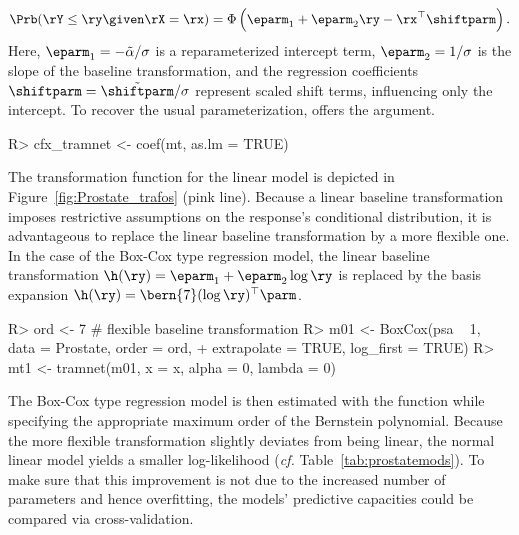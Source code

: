\begin{align*} \label{Lm}
  \Prb(\rY \le  \ry \given \rX = \rx) = \Phi\left(\eparm_1 + \eparm_2 \ry -
    \rx^\top \shiftparm\right).
\end{align*}
Here, $\eparm_1 = -\tilde{\alpha} / \sigma$ is a reparameterized intercept term,
$\eparm_2 = 1 / \sigma$ is the slope of the baseline transformation, and the
regression coefficients $\shiftparm = \tilde{\shiftparm} / \sigma$ represent
scaled shift terms, influencing only the intercept. To recover the usual
parameterization,  offers the  argument.
\begin{example}
R> cfx_tramnet <- coef(mt, as.lm = TRUE)
\end{example}
The transformation function for the linear model is depicted in 
Figure~\ref{fig:Prostate_trafos} (pink line).
Because a linear baseline transformation imposes restrictive assumptions on the
response's conditional distribution, it is advantageous to replace the linear baseline
transformation by a more flexible one. In the case of the Box-Cox type regression
model, the linear baseline transformation $\h(\ry) = \eparm_1 + \eparm_2 \log\ry$
is replaced by the basis expansion $\h(\ry) = \bern{7}(\log\ry)^\top \parm$.
\begin{example}
R> ord <- 7 # flexible baseline transformation
R> m01 <- BoxCox(psa ~ 1, data = Prostate, order = ord,
+                extrapolate = TRUE, log_first = TRUE)
R> mt1 <- tramnet(m01, x = x, alpha = 0, lambda = 0)
\end{example}
The Box-Cox type regression model is then estimated with the  function
while specifying the appropriate maximum order of the Bernstein polynomial.
Because the more flexible transformation slightly deviates from being linear, the normal
linear model yields a smaller log-likelihood (\emph{cf.} Table~\ref{tab:prostatemods}).
To make sure that this improvement is not due to the increased number of parameters
and hence overfitting, the models' predictive capacities could be compared via
cross-validation.

